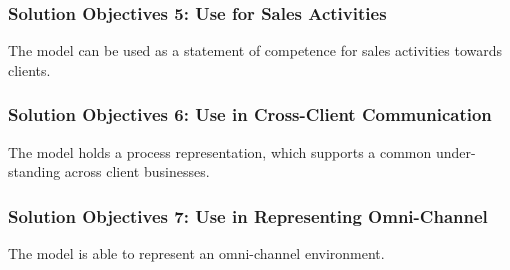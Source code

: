 \subsubsection{Solution Objectives 5: Use for Sales Activities}
The model can be used as a statement of competence for sales activities towards clients.

\subsubsection{Solution Objectives 6: Use in Cross-Client Communication}
The model holds a process representation, which supports a common under- standing across client businesses.

\subsubsection{Solution Objectives 7: Use in Representing Omni-Channel}
The model is able to represent an omni-channel environment.

